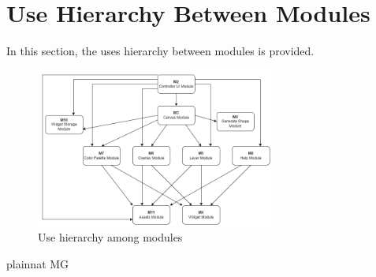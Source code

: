 \documentclass[12pt, titlepage]{article}
\newcounter{mnum}
\newcommand{\mthemnum}{M\themnum}
\begin{document}


\section{Use Hierarchy Between Modules} \label{SecUse}

In this section, the uses hierarchy between modules is
provided.

\begin{figure}[H]
\centering
\includegraphics[width=0.7\textwidth]{images/UsesHierarchy.png}
\caption{Use hierarchy among modules}
\label{FigUH}
\end{figure}


 {plainnat}
 {MG}
\end{document}

